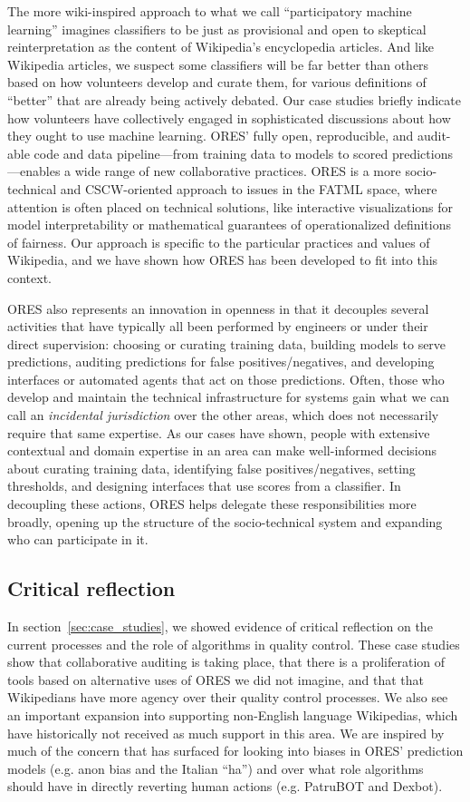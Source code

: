 The more wiki-inspired approach to what we call ``participatory machine learning'' imagines classifiers to be just as provisional and open to skeptical reinterpretation as the content of Wikipedia's encyclopedia articles. And like Wikipedia articles, we suspect some classifiers will be far better than others based on how volunteers develop and curate them, for various definitions of ``better'' that are already being actively debated. Our case studies briefly indicate how volunteers have collectively engaged in sophisticated discussions about how they ought to use machine learning. ORES' fully open, reproducible, and audit-able code and data pipeline---from training data to models to scored predictions---enables a wide range of new collaborative practices. ORES is a more socio-technical and CSCW-oriented approach to issues in the FATML space, where attention is often placed on technical solutions, like interactive visualizations for model interpretability or mathematical guarantees of operationalized definitions of fairness.  Our approach is specific to the particular practices and values of Wikipedia, and we have shown how ORES has been developed to fit into this context.

ORES also represents an innovation in openness in that it decouples several activities that have typically all been performed by engineers or under their direct supervision: choosing or curating training data, building models to serve predictions, auditing predictions for false positives/negatives, and developing interfaces or automated agents that act on those predictions. Often, those who develop and maintain the technical infrastructure for systems gain what we can call an \textit{incidental jurisdiction} over the other areas, which does not necessarily require that same expertise. As our cases have shown, people with extensive contextual and domain expertise in an area can make well-informed decisions about curating training data, identifying false positives/negatives, setting thresholds, and designing interfaces that use scores from a classifier. In decoupling these actions, ORES helps delegate these responsibilities more broadly, opening up the structure of the socio-technical system and expanding who can participate in it.

\subsection{Critical reflection}
In section~\ref{sec:case_studies}, we showed evidence of critical reflection on the current processes and the role of algorithms in quality control.  These case studies show that collaborative auditing is taking place, that there is a proliferation of tools based on alternative uses of ORES we did not imagine, and that that Wikipedians have more agency over their quality control processes. We also see an important expansion into supporting non-English language Wikipedias, which have historically not received as much support in this area. We are inspired by much of the concern that has surfaced for looking into biases in ORES' prediction models (e.g. anon bias and the Italian ``ha'') and over what role algorithms should have in directly reverting human actions (e.g. PatruBOT and Dexbot).

